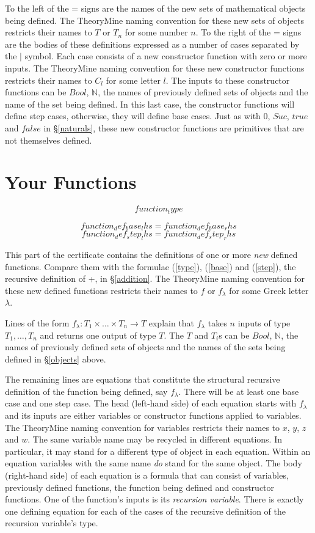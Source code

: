 \documentclass[twocolumn]{article}
\newcommand{\nat}{\mathbb{N}}
\begin{document}
To the left of the = signs are the names of the new sets of mathematical objects
being defined.  The TheoryMine naming convention for these new sets of objects
restricts their names to $T$ or $T_n$ for some number $n$. To the right of the =
signs are the bodies of these definitions expressed as a number of cases
separated by the $|$ symbol. Each case consists of a new constructor function
with zero or more inputs. The TheoryMine naming convention for these new
constructor functions restricts their names to $C_l$ for some letter $l$. The
inputs to these constructor functions can be $Bool$, $\nat$, the names of previously
defined sets of objects and the name of the set being defined. In this last
case, the constructor functions will define step cases, otherwise, they will
define base cases. Just as with $0$, $Suc$, $true$ and $false$ in
\S\ref{naturals}, these new constructor functions are primitives that are not
themselves defined.



\section{Your Functions}
\label{functions}

$${{{function_type}}}$$

$${{{function_def_base_lhs}}} = {{{function_def_base_rhs}}}$$
$${{{function_def_step_lhs}}} = {{{function_def_step_rhs}}}$$

This part of the certificate contains the definitions of one or more {\em new}
defined functions. Compare them with the formulae (\ref{type}), (\ref{base})
and (\ref{step}), the recursive definition of +, in \S\ref{addition}. The
TheoryMine naming convention for these new defined functions restricts their
names to $f$ or $f_{\lambda}$ for some Greek letter $\lambda$.

Lines of the form $f_{\lambda} : T_1 \times \ldots \times T_n \rightarrow T$
explain that $f_{\lambda}$ takes $n$ inputs of type $T_1, \ldots, T_n$ and
returns one output of type $T$. The $T$ and $T_i$s can be $Bool$, $\nat$, the names of
previously defined sets of objects and the names of the sets being defined in
\S\ref{objects} above.

The remaining lines are equations that constitute the structural recursive
definition of the function being defined, say $f_{\lambda}$. There will be at
least one base case and one step case. The head (left-hand side) of each
equation starts with $f_{\lambda}$ and its inputs are either variables or
constructor functions applied to variables. The TheoryMine naming convention for
variables restricts their names to $x$, $y$, $z$ and $w$. The same variable name
may be recycled in different equations.  In particular, it may stand for a
different type of object in each equation. Within an equation variables with
the same name {\em do} stand for the same object. The body (right-hand side) of
each equation is a formula that can consist of variables, previously defined
functions, the function being defined and constructor functions. One of the
function's inputs is its {\em recursion variable}. There is exactly one defining
equation for each of the cases of the recursive definition of the recursion
variable's type.
\end{document}
